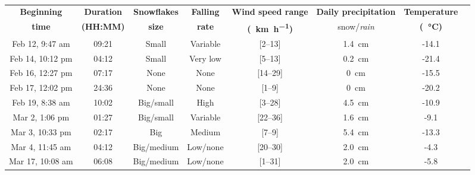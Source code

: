 \begin{table}[htbp]
    \centering
    \\
    \begin{tabular}{|c|c|c|c|c|c|c|c|}
        \hline
        \textbf{Beginning} & \textbf{Duration} & \textbf{Snowflakes} & \textbf{Falling} & \textbf{Wind speed range}      & \textbf{Daily precipitation}  & \textbf{Temperature}     \\
        \textbf{time}      & \textbf{(HH:MM)}  & \textbf{size}       & \textbf{rate}    & \textbf{(\SI{}{\km\per\hour})} & snow/\textit{rain}            & \textbf{(\SI{}{\celsius})}      \\\hline
        Feb 12, 9:47 am    &  09:21            & Small               & Variable         & [2--13]                         & \SI{1.4}{\cm}                 & -14.1 \\\hline
        Feb 14, 10:12 pm   &  04:12            & Small               & Very low         & [5--13]                         & \SI{0.2}{\cm}                 & -21.4 \\\hline
        Feb 16, 12:27 pm   &  07:17            & None                & None             & [14--29]                        & \SI{0}{\cm}                   & -15.5 \\\hline
        Feb 17, 12:02 pm   &  24:36            & None                & None             & [1--9]                          & \SI{0}{\cm}                   & -20.2 \\\hline
        Feb 19, 8:38 am    &  10:02            & Big/small           & High             & [3--28]                         & \SI{4.5}{\cm}                 & -10.9 \\\hline
        Mar 2, 1:06 pm     &  01:27            & Big/small           & Variable         & [22--36]                        & \SI{1.6}{\cm}                 & -9.1  \\\hline
        Mar 3, 10:33 pm    &  02:17            & Big                 & Medium           & [7--9]                          & \SI{5.4}{\cm}                 & -13.3 \\\hline
        Mar 4, 11:45 am    &  04:12            & Big/medium          & Low/none         & [20--30]                        & \SI{2.0}{\cm}                 & -4.3  \\\hline
        Mar 17, 10:08 am   &  06:08            & Big/medium          & Low/none         & [1--31]                         & \SI{2.0}{\cm}                 & -5.8  \\\hline

\end{tabular}
\end{table}
